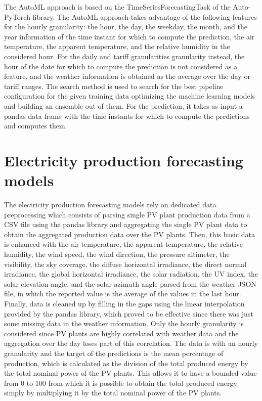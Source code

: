 The AutoML approach is based on the TimeSeriesForecastingTask of the Auto-PyTorch library.
The AutoML approach takes advantage of the following features for the hourly granularity: the hour, the day, the weekday, the month, and the year information of the time instant for which to compute the prediction, the air temperature, the apparent temperature, and the relative humidity in the considered hour.
For the daily and tariff granularities granularity instead, the hour of the date for which to compute the prediction is not considered as a feature, and the weather information is obtained as the average over the day or tariff ranges.
The search method is used to search for the best pipeline configuration for the given training data optimizing the machine learning models and building an ensemble out of them.
For the prediction, it takes as input a pandas data frame with the time instants for which to compute the predictions and computes them.


\section{Electricity production forecasting models}
\label{sec:productionimpl}
\vspace{0.2 cm}

The electricity production forecasting models rely on dedicated data preprocessing which consists of parsing single PV plant production data from a CSV file using the pandas library and aggregating the single PV plant data to obtain the aggregated production data over the PV plants.
Then, this basic data is enhanced with the air temperature, the apparent temperature, the relative humidity, the wind speed, the wind direction, the pressure altimeter, the visibility, the sky coverage, the diffuse horizontal irradiance, the direct normal irradiance, the global horizontal irradiance, the solar radiation, the UV index, the solar elevation angle, and the solar azimuth angle parsed from the weather JSON file, in which the reported value is the average of the values in the last hour.
Finally, data is cleaned up by filling in the gaps using the linear interpolation provided by the pandas library, which proved to be effective since there was just some missing data in the weather information.
Only the hourly granularity is considered since PV plants are highly correlated with weather data and the aggregation over the day loses part of this correlation.
The data is with an hourly granularity and the target of the predictions is the mean percentage of production, which is calculated as the division of the total produced energy by the total nominal power of the PV plants.
This allows it to have a bounded value from 0 to 100 from which it is possible to obtain the total produced energy simply by multiplying it by the total nominal power of the PV plants.

